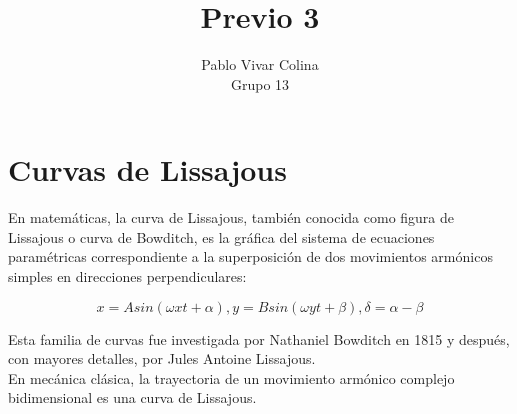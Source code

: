 \documentclass{article}
\title{Previo 3}
\author{Pablo Vivar Colina\\
Grupo 13\\
}
\begin{document}
\maketitle

\section{Curvas de Lissajous}

En matemáticas, la curva de Lissajous, también conocida como figura de Lissajous o curva de Bowditch, es la gráfica del sistema de ecuaciones paramétricas correspondiente a la superposición de dos movimientos armónicos simples en direcciones perpendiculares:\citep{CurvasLiss}

\begin{equation}
    x = A sin ⁡ (ω x t + \alpha ) , y = B sin ⁡ ( ω y t + β ) , δ = \alpha  − β 
\end{equation}

    

Esta familia de curvas fue investigada por Nathaniel Bowditch en 1815 y después, con mayores detalles, por Jules Antoine Lissajous.\citep{CurvasLiss}\\

En mecánica clásica, la trayectoria de un movimiento armónico complejo bidimensional es una curva de Lissajous.\citep{CurvasLiss}
\end{document}
